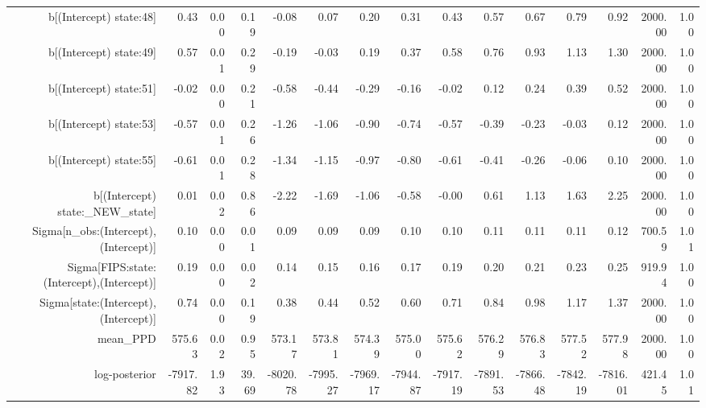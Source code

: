 \begin{table}[ht]
\begin{tabular}{rrrrrrrrrrrrrrr}
  b[(Intercept) state:48] & 0.43 & 0.00 & 0.19 & -0.08 & 0.07 & 0.20 & 0.31 & 0.43 & 0.57 & 0.67 & 0.79 & 0.92 & 2000.00 & 1.00 \\ 
  b[(Intercept) state:49] & 0.57 & 0.01 & 0.29 & -0.19 & -0.03 & 0.19 & 0.37 & 0.58 & 0.76 & 0.93 & 1.13 & 1.30 & 2000.00 & 1.00 \\ 
  b[(Intercept) state:51] & -0.02 & 0.00 & 0.21 & -0.58 & -0.44 & -0.29 & -0.16 & -0.02 & 0.12 & 0.24 & 0.39 & 0.52 & 2000.00 & 1.00 \\ 
  b[(Intercept) state:53] & -0.57 & 0.01 & 0.26 & -1.26 & -1.06 & -0.90 & -0.74 & -0.57 & -0.39 & -0.23 & -0.03 & 0.12 & 2000.00 & 1.00 \\ 
  b[(Intercept) state:55] & -0.61 & 0.01 & 0.28 & -1.34 & -1.15 & -0.97 & -0.80 & -0.61 & -0.41 & -0.26 & -0.06 & 0.10 & 2000.00 & 1.00 \\ 
  b[(Intercept) state:\_NEW\_state] & 0.01 & 0.02 & 0.86 & -2.22 & -1.69 & -1.06 & -0.58 & -0.00 & 0.61 & 1.13 & 1.63 & 2.25 & 2000.00 & 1.00 \\ 
  Sigma[n\_obs:(Intercept),(Intercept)] & 0.10 & 0.00 & 0.01 & 0.09 & 0.09 & 0.09 & 0.10 & 0.10 & 0.11 & 0.11 & 0.11 & 0.12 & 700.59 & 1.01 \\ 
  Sigma[FIPS:state:(Intercept),(Intercept)] & 0.19 & 0.00 & 0.02 & 0.14 & 0.15 & 0.16 & 0.17 & 0.19 & 0.20 & 0.21 & 0.23 & 0.25 & 919.94 & 1.00 \\ 
  Sigma[state:(Intercept),(Intercept)] & 0.74 & 0.00 & 0.19 & 0.38 & 0.44 & 0.52 & 0.60 & 0.71 & 0.84 & 0.98 & 1.17 & 1.37 & 2000.00 & 1.00 \\ 
  mean\_PPD & 575.63 & 0.02 & 0.95 & 573.17 & 573.81 & 574.39 & 575.00 & 575.62 & 576.29 & 576.83 & 577.52 & 577.98 & 2000.00 & 1.00 \\ 
  log-posterior & -7917.82 & 1.93 & 39.69 & -8020.78 & -7995.27 & -7969.17 & -7944.87 & -7917.19 & -7891.53 & -7866.48 & -7842.19 & -7816.01 & 421.45 & 1.01 \\ 
   \hline
\end{tabular}
\end{table}

